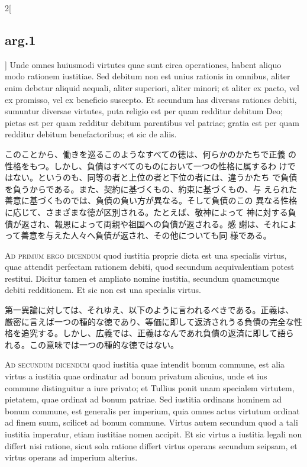 \documentclass[paper=a4paper,fontsize=10pt,jafontsize=9pt,titlepage]{jlreq}
\begin{document}
\begin{paracol}{2}[\subsection{arg.1}]
Unde omnes huiusmodi virtutes quae sunt circa operationes, habent
aliquo modo rationem iustitiae. Sed debitum non est unius rationis in
omnibus, aliter enim debetur aliquid aequali, aliter superiori, aliter
minori; et aliter ex pacto, vel ex promisso, vel ex beneficio
suscepto. Et secundum has diversas rationes debiti, sumuntur diversae
virtutes, puta religio est per quam redditur debitum Deo; pietas est
per quam redditur debitum parentibus vel patriae; gratia est per quam
redditur debitum benefactoribus; et sic de aliis.

\switchcolumn

このことから、働きを巡るこのようなすべての徳は、何らかのかたちで正義
 の性格をもつ。しかし、負債はすべてのものにおいて一つの性格に属するわ
 けではない。というのも、同等の者と上位の者と下位の者には、違うかたち
 で負債を負うからである。また、契約に基づくもの、約束に基づくもの、与
 えられた善意に基づくものでは、負債の負い方が異なる。そして負債のこの
 異なる性格に応じて、さまざまな徳が区別される。たとえば、敬神によって
 神に対する負債が返され、報恩によって両親や祖国への負債が返される。感
 謝は、それによって善意を与えた人々へ負債が返され、その他についても同
 様である。

\switchcolumn*[\subsection{ad.1}]

{\scshape Ad primum ergo dicendum} quod iustitia proprie dicta est una
specialis virtus, quae attendit perfectam rationem debiti, quod
secundum aequivalentiam potest restitui. Dicitur tamen et ampliato
nomine iustitia, secundum quamcumque debiti redditionem. Et sic non
est una specialis virtus.

\switchcolumn

第一異論に対しては、それゆえ、以下のように言われるべきである。正義は、
 厳密に言えば一つの種的な徳であり、等価に即して返済されうる負債の完全な性
 格を追究する。しかし、広義では、正義はなんであれ負債の返済に即して語ら
 れる。この意味では一つの種的な徳ではない。

\switchcolumn*[\subsection{ad.2}]

{\scshape Ad secundum dicendum} quod iustitia quae intendit bonum
commune, est alia virtus a iustitia quae ordinatur ad bonum privatum
alicuius, unde et ius commune distinguitur a iure privato; et Tullius
ponit unam specialem virtutem, pietatem, quae ordinat ad bonum
patriae. Sed iustitia ordinans hominem ad bonum commune, est generalis
per imperium, quia omnes actus virtutum ordinat ad finem suum,
scilicet ad bonum commune. Virtus autem secundum quod a tali iustitia
imperatur, etiam iustitiae nomen accipit. Et sic virtus a iustitia
legali non differt nisi ratione, sicut sola ratione differt virtus
operans secundum seipsam, et virtus operans ad imperium alterius.


\end{paracol}
\end{document}
